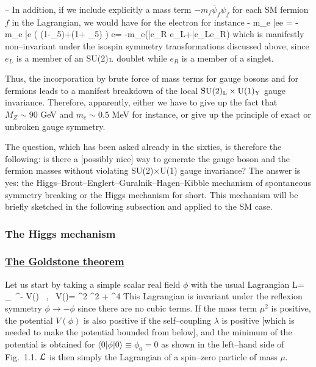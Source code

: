 -- In addition, if we include explicitly a mass term $-m_f \overline{\psi}_f 
\psi_f$ for each SM fermion $f$ in the Lagrangian, we would have for the 
electron for instance
\beq
- m_e \bar{e}e = -m_e \bar{e} \bigg(  (1-\gamma_5)+(1+
\gamma_5) \bigg) e= -m_e(\bar{e}_R e_L+\bar{e}_Le_R) 
\eeq
which is manifestly non--invariant under the isospin symmetry transformations
discussed above, since $e_L$ is a member of an SU(2)$_{\rm L}$ doublet while 
$e_R$ is a member of a singlet. \s

Thus, the incorporation by brute force of mass terms for gauge bosons and for 
fermions leads to a manifest breakdown of the local ${\rm SU(2)_L\times U(1)_Y}
$ gauge invariance. Therefore, apparently, either we have to give up the fact 
that $M_Z\sim 90$ GeV and $m_e \sim 0.5$ MeV for instance, or give up the 
principle of exact or unbroken gauge symmetry. \s

The question, which has been asked already in the sixties, is therefore the
following: is there a  [possibly nice] way to generate the gauge boson and
the fermion masses without violating  SU(2)$\times$U(1) gauge invariance? 
The answer is yes: the Higgs--Brout--Englert--Guralnik--Hagen--Kibble mechanism
of spontaneous symmetry breaking \cite{Higgs} or the Higgs mechanism for short.
This mechanism will be briefly sketched in the following subsection and applied
to the SM case. 	

\subsubsection{The Higgs mechanism}

\subsubsection*{\underline{The Goldstone  theorem}} 

Let us start by taking a simple scalar real field $\phi$ with the usual 
Lagrangian 
\beq
{\cal L}=  \partial_\mu \phi \, \partial^\mu \phi - V(\phi) 
\ , \ V(\phi)=  \mu^2 \phi^2 + \lambda \phi^4
\eeq
This Lagrangian is invariant under the reflexion symmetry $\phi \to -\phi$
since there are no cubic terms.  If the mass term $\mu^2$ is positive, the
potential $V(\phi)$ is also positive if the self--coupling $\lambda$ is
positive [which is needed to make the potential bounded from below], and the 
minimum of the potential is obtained for $\langle 0| \phi | 0 \rangle \equiv
\phi_0=0$ as shown in the left--hand side of Fig.~1.1. ${\cal L}$ is then 
simply the Lagrangian of a spin--zero particle of mass $\mu$. \s

